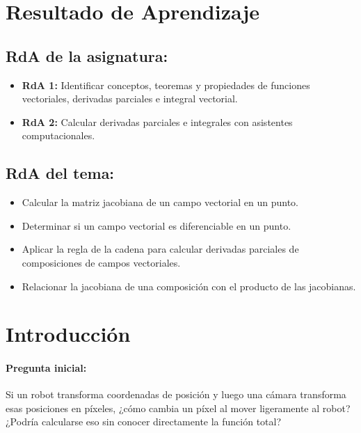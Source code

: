 \documentclass[a4,11pt]{aleph-notas}
\begin{document}
\encabezado

\section*{Resultado de Aprendizaje}

\subsection*{RdA de la asignatura:}
\begin{itemize}[leftmargin=*]
    \item \textbf{RdA 1:} Identificar conceptos, teoremas y propiedades de funciones vectoriales, derivadas parciales e integral vectorial.
    \item \textbf{RdA 2:} Calcular derivadas parciales e integrales con asistentes computacionales.
\end{itemize}

\subsection*{RdA del tema:}
\begin{itemize}[leftmargin=*]
    \item Calcular la matriz jacobiana de un campo vectorial en un punto.
    \item Determinar si un campo vectorial es diferenciable en un punto.
    \item Aplicar la regla de la cadena para calcular derivadas parciales de composiciones de campos vectoriales.
    \item Relacionar la jacobiana de una composición con el producto de las jacobianas.
\end{itemize}

\section*{Introducción}

\paragraph{Pregunta inicial:}
Si un robot transforma coordenadas de posición y luego una cámara transforma esas posiciones en píxeles, ¿cómo cambia un píxel al mover ligeramente al robot? ¿Podría calcularse eso sin conocer directamente la función total?
\end{document}
